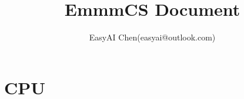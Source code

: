 \documentclass[10pt,fancyhdr,UTF8]{ctexbook}
\title{EmmmCS Document}
\author{EasyAI Chen(easyai@outlook.com)}
\begin{document}
\maketitle
\tableofcontents
\mainmatter
\part{CPU}


\end{document}
